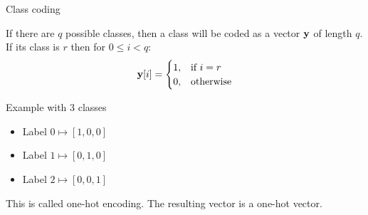 \documentclass[xcolor=pdftex,dvipsnames,table,mathserif]{beamer}
\begin{document}







\begin{frame}{Class coding}

  If there are $q$ possible classes, then a class will be coded as a vector $\mathbf{y}$ of length $q$. If its class is $r$  then for $0 \leq i < q$:
  \[
  \mathbf{y}[i] =
  \begin{cases}
    1, & \text{if}\ i=r \\
    0, & \text{otherwise}
  \end{cases}
  \]

  \begin{block}{Example with $3$ classes}
    \begin{itemize}
    \item
      Label $0 \longmapsto [1,0,0]$
    \item
      Label $1 \longmapsto [0,1,0]$
    \item
      Label $2 \longmapsto [0,0,1]$
    \end{itemize}
  \end{block}

  This is called \alert{one-hot encoding}. The resulting vector is a one-hot vector.

\end{frame}
\end{document}
